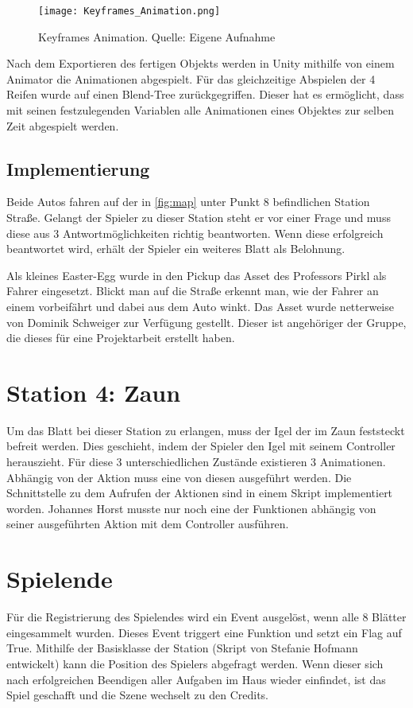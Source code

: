 \begin{figure}[H]
	\centering
	\texttt{[image: Keyframes\_Animation.png]}
	\caption[Keyframes Animation]{Keyframes Animation. Quelle: Eigene Aufnahme}
	\label{fig:keyframes_animation}
\end{figure}

Nach dem Exportieren des fertigen Objekts werden in Unity mithilfe von einem Animator die Animationen abgespielt. Für das gleichzeitige Abspielen der 4 Reifen wurde auf einen Blend-Tree zurückgegriffen. Dieser hat es ermöglicht, dass mit seinen festzulegenden Variablen alle Animationen eines Objektes zur selben Zeit abgespielt werden. 


\subsection{Implementierung}
Beide Autos fahren auf der in \autoref{fig:map} unter Punkt 8 befindlichen Station Straße. Gelangt der Spieler zu dieser Station steht er vor einer Frage und muss diese aus 3 Antwortmöglichkeiten richtig beantworten. Wenn diese erfolgreich beantwortet wird, erhält der Spieler ein weiteres Blatt als Belohnung.

Als kleines Easter-Egg wurde in den Pickup das Asset des Professors Pirkl als Fahrer eingesetzt. Blickt man auf die Straße erkennt man, wie der Fahrer an einem vorbeifährt und dabei aus dem Auto winkt. Das Asset wurde netterweise von Dominik Schweiger zur Verfügung gestellt. Dieser ist angehöriger der Gruppe, die dieses für eine Projektarbeit erstellt haben.


\section{Station 4: Zaun}
Um das Blatt bei dieser Station zu erlangen, muss der Igel der im Zaun feststeckt befreit werden. Dies geschieht, indem der Spieler den Igel mit seinem Controller herauszieht. Für diese 3 unterschiedlichen Zustände existieren 3 Animationen. Abhängig von der Aktion muss eine von diesen ausgeführt werden. Die Schnittstelle zu dem Aufrufen der Aktionen sind in einem Skript implementiert worden. Johannes Horst musste nur noch eine der Funktionen abhängig von seiner ausgeführten Aktion mit dem Controller ausführen.

\section{Spielende}
Für die Registrierung des Spielendes wird ein Event ausgelöst, wenn alle 8 Blätter eingesammelt wurden. Dieses Event triggert eine Funktion und setzt ein Flag auf True. Mithilfe der Basisklasse der Station (Skript von Stefanie Hofmann entwickelt) kann die Position des Spielers abgefragt werden. Wenn dieser sich nach erfolgreichen Beendigen aller Aufgaben im Haus wieder einfindet, ist das Spiel geschafft und die Szene wechselt zu den Credits.



